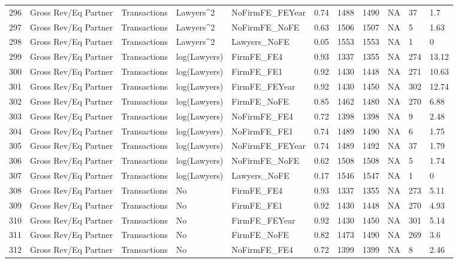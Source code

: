 \begin{table}[ht]
\begin{tabular}{rllllllllll}
  296 & Gross Rev/Eq Partner & Transactions & Lawyers^2 & NoFirmFE\_FEYear & 0.74 & 1488 & 1490 & NA & 37 & 1.7 \\ 
  297 & Gross Rev/Eq Partner & Transactions & Lawyers^2 & NoFirmFE\_NoFE & 0.63 & 1506 & 1507 & NA & 5 & 1.63 \\ 
  298 & Gross Rev/Eq Partner & Transactions & Lawyers^2 & Lawyers\_NoFE & 0.05 & 1553 & 1553 & NA & 1 & 0 \\ 
  299 & Gross Rev/Eq Partner & Transactions & log(Lawyers) & FirmFE\_FE4 & 0.93 & 1337 & 1355 & NA & 274 & 13.12 \\ 
  300 & Gross Rev/Eq Partner & Transactions & log(Lawyers) & FirmFE\_FE1 & 0.92 & 1430 & 1448 & NA & 271 & 10.63 \\ 
  301 & Gross Rev/Eq Partner & Transactions & log(Lawyers) & FirmFE\_FEYear & 0.92 & 1430 & 1450 & NA & 302 & 12.74 \\ 
  302 & Gross Rev/Eq Partner & Transactions & log(Lawyers) & FirmFE\_NoFE & 0.85 & 1462 & 1480 & NA & 270 & 6.88 \\ 
  303 & Gross Rev/Eq Partner & Transactions & log(Lawyers) & NoFirmFE\_FE4 & 0.72 & 1398 & 1398 & NA & 9 & 2.48 \\ 
  304 & Gross Rev/Eq Partner & Transactions & log(Lawyers) & NoFirmFE\_FE1 & 0.74 & 1489 & 1490 & NA & 6 & 1.75 \\ 
  305 & Gross Rev/Eq Partner & Transactions & log(Lawyers) & NoFirmFE\_FEYear & 0.74 & 1489 & 1492 & NA & 37 & 1.79 \\ 
  306 & Gross Rev/Eq Partner & Transactions & log(Lawyers) & NoFirmFE\_NoFE & 0.62 & 1508 & 1508 & NA & 5 & 1.74 \\ 
  307 & Gross Rev/Eq Partner & Transactions & log(Lawyers) & Lawyers\_NoFE & 0.17 & 1546 & 1547 & NA & 1 & 0 \\ 
  308 & Gross Rev/Eq Partner & Transactions & No & FirmFE\_FE4 & 0.93 & 1337 & 1355 & NA & 273 & 5.11 \\ 
  309 & Gross Rev/Eq Partner & Transactions & No & FirmFE\_FE1 & 0.92 & 1430 & 1448 & NA & 270 & 4.93 \\ 
  310 & Gross Rev/Eq Partner & Transactions & No & FirmFE\_FEYear & 0.92 & 1430 & 1450 & NA & 301 & 5.14 \\ 
  311 & Gross Rev/Eq Partner & Transactions & No & FirmFE\_NoFE & 0.82 & 1473 & 1490 & NA & 269 & 3.6 \\ 
  312 & Gross Rev/Eq Partner & Transactions & No & NoFirmFE\_FE4 & 0.72 & 1399 & 1399 & NA & 8 & 2.46 \\ 

\end{tabular}
\end{table}
